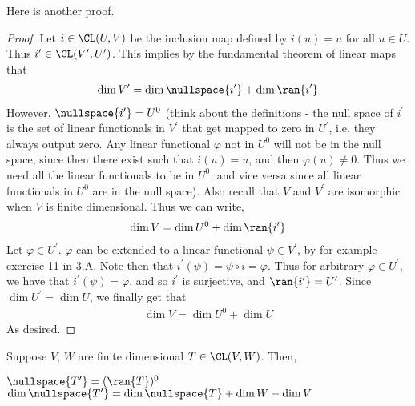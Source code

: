 \documentclass{article}
\begin{document}
  Here is another proof.
  \begin{proof}
    Let $i \in \CL(U, V)$ be the inclusion map defined by $i(u) = u$ for all $u \in U$. Thus $i^{\prime} \in \CL(V^{\prime}, U^{\prime})$. This implies by the fundamental theorem of linear
    maps that
    \begin{align*}
      \dim V^{\prime} = \dim\nullspace{i^{\prime}} + \dim\ran{i^{\prime}}
    \end{align*}
    However, $\nullspace{i^{\prime}} = U^0$ (think about the definitions - the null space of $i^{\prime}$ is the set of linear functionals in $V^{\prime}$ that get mapped to zero in
    $U^{\prime}$, i.e. they always output zero. Any linear functional $\varphi$ not in $U^0$ will not be in the null space, since then there exist such that $i(u) = u$, and then $\varphi(u)
    \neq 0$. Thus we need all the linear functionals to be in $U^0$, and vice versa since all linear functionals in $U^0$ are in the null space). Also recall that $V$ and $V^\prime$ are
    isomorphic when $V$ is finite dimensional. Thus we can write,
    \begin{align*}
      \dim V = \dim U^0 + \dim\ran{i^{\prime}}
    \end{align*}
    Let $\varphi \in U^{\prime}$. $\varphi$ can be extended to a linear functional $\psi \in V^{\prime}$, by for example exercise 11 in 3.A. Note then that $i^{\prime}(\psi) = \psi \circ i =
    \varphi$. Thus for arbitrary $\varphi \in U^{\prime}$, we have that $i^{\prime}(\psi) = \varphi$, and so $i^{\prime}$ is surjective, and $\ran{i^{\prime}} = U^{\prime}$. Since $\dim
    U^{\prime} = \dim U$, we finally get that
    \begin{align*}
      \dim V = \dim U^0 + \dim U
    \end{align*}
    As desired.
  \end{proof}
  \begin{prop}\label{prop:null_dual_range_annihilator}
    Suppose $V$, $W$ are finite dimensional $T \in \CL(V, W)$. Then,
    \begin{enumerate}[label=\alph*)]
        \ii 
          $\nullspace{T^{\prime}} = (\ran{T})^{0}$
        \ii 
          $\dim\nullspace{T^{\prime}} = \dim\nullspace{T} + \dim W - \dim V$
    \end{enumerate}
  \end{prop}
\end{document}
